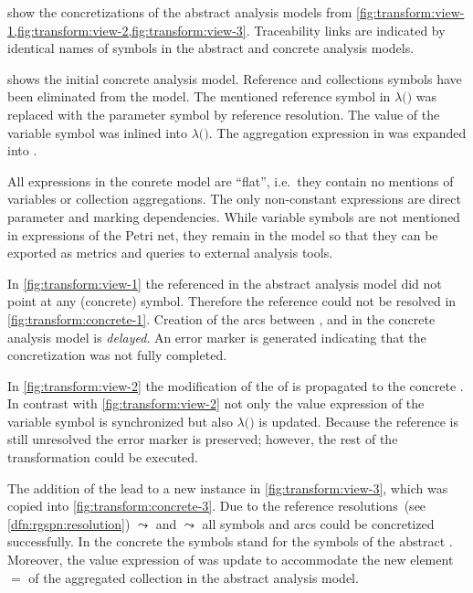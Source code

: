 \begin{runningExample}
   show the concretizations of the abstract analysis models from \vref{fig:transform:view-1,fig:transform:view-2,fig:transform:view-3}. Traceability links are indicated by identical names of symbols in the abstract and concrete analysis models.

   shows the initial concrete analysis model. Reference and collections symbols have been eliminated from the model. The mentioned reference symbol  in  \(\lambda(\)\()\) was replaced with the parameter symbol  by reference resolution. The value of the variable symbol  was inlined into \(\lambda(\)\()\). The aggregation expression in  was expanded into .

  All expressions in the conrete model are \enquote{flat}, i.e.~they contain no mentions of variables or collection aggregations. The only non-constant expressions are direct parameter and marking dependencies. While variable symbols are not mentioned in expressions of the Petri net, they remain in the model so that they can be exported as metrics and queries to external analysis tools.

  In \vref{fig:transform:view-1} the referenced  in the abstract analysis model did not point at any (concrete) symbol. Therefore the reference could not be resolved in \vref{fig:transform:concrete-1}. Creation of the arcs between ,  and  in the concrete analysis model is \emph{delayed}. An error marker is generated indicating that the concretization was not fully completed.

  In \vref{fig:transform:view-2} the modification of the  of  is propagated to the concrete . In contrast with \vref{fig:transform:view-2} not only the value expression of the variable symbol  is synchronized but also \(\lambda(\)\()\) is updated. Because the reference  is still unresolved the error marker is preserved; however, the rest of the transformation could be executed.

  The addition of the   lead to a new  instance  in \vref{fig:transform:view-3}, which was copied into \vref{fig:transform:concrete-3}. Due to the reference resolutions~(see \vref{dfn:rgspn:resolution})  \(\leadsto\)  and  \(\leadsto\)  all symbols and arcs could be concretized successfully. In the concrete  the  symbols stand for the  symbols of the abstract . Moreover, the value expression of  was update to accommodate the new element  \(=\)  of the aggregated collection  in the abstract analysis model.
\end{runningExample}

